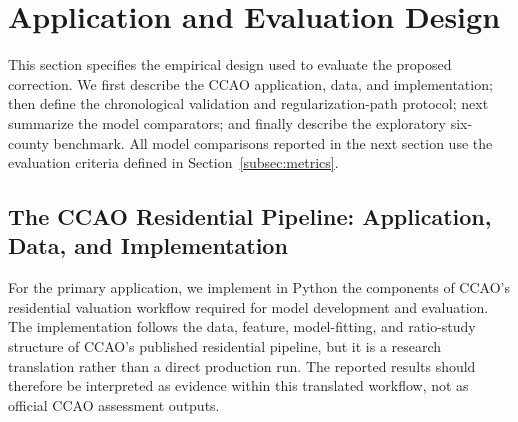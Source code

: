\documentclass[10pt]{article}
\theoremstyle{definition}
\newcommand{\1}{\mathbf{1}}
\begin{document}
\section{Application and Evaluation Design}
\label{sec:empirical_design}

{This section specifies the empirical design used to evaluate the proposed correction. We first describe the CCAO application, data, and implementation; then define the chronological validation and regularization-path protocol; next summarize the model comparators; and finally describe the exploratory six-county benchmark. All model comparisons reported in the next section use the evaluation criteria defined in Section~\ref{subsec:metrics}.}


\subsection{{The CCAO Residential Pipeline: Application, Data, and Implementation}}
\label{subsec:ccao_design}


{For the primary application, we implement in Python the components of CCAO's residential valuation workflow required for model development and evaluation. The implementation follows the data, feature, model-fitting, and ratio-study structure of CCAO's published residential pipeline, but it is a research translation rather than a direct production run. The reported results should therefore be interpreted as evidence within this translated workflow, not as official CCAO assessment outputs.}

\end{document}
